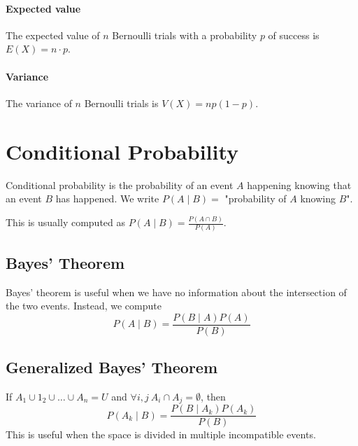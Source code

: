 \documentclass[10pt,a4paper]{book}
\begin{document}
\paragraph{Expected value}
The expected value of $n$ Bernoulli trials with a probability $p$ of success is $E(X)=n\cdot p$.
\paragraph{Variance}
The variance of $n$ Bernoulli trials is $V(X)=np(1-p)$.
\section{Conditional Probability}
Conditional probability is the probability of an event $A$ happening knowing that an event $B$ has happened. We write $P(A\mid B)=$ "probability of $A$ knowing $B$".\par 
This is usually computed as $P(A\mid B)=\frac{P(A\cap B)}{P(A)}$.
\subsection{Bayes' Theorem}
Bayes' theorem is useful when we have no information about the intersection of the two events. Instead, we compute
\[P(A\mid B)= \frac{P(B\mid A)P(A)​}{P(B)}\]
\subsection{Generalized Bayes' Theorem}
If $A_1\cup 1_2\cup\ldots\cup A_n=U$ and $\forall i,j\ A_i\cap A_j=\emptyset$, then 
\[P(A_k\mid B)=\frac{P(B\mid A_k)P(A_k)}{P(B)}\]
This is useful when the space is divided in multiple incompatible events.
 

\end{document}
